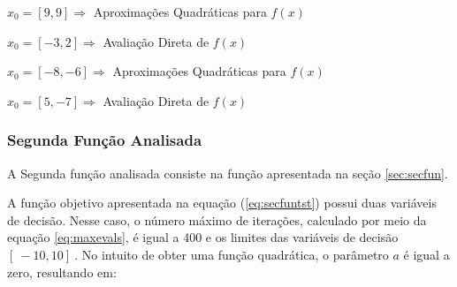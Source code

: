         \begin{minipage}{\linewidth}
            \centering
            $x_0=[9,9]\Longrightarrow$  Aproximações Quadráticas para $f(x)$
            \label{tab:tbla} 
            \writetable{\tbla}
            \bigskip
        \end{minipage}

        \begin{minipage}{\linewidth}
            \centering
            $x_0=[-3,2]\Longrightarrow$  Avaliação Direta de $f(x)$
            \label{tab:tblb} 
            \writetable{\tblb}
            \bigskip
        \end{minipage}

        \begin{minipage}{\linewidth}
            \centering
            $x_0=[-8,-6]\Longrightarrow$  Aproximações Quadráticas para $f(x)$
            \label{tab:tblc} 
            \writetable{\tblc}
            \bigskip
        \end{minipage}
        
        \begin{minipage}{\linewidth}
            \centering
            $x_0=[5,-7]\Longrightarrow$  Avaliação Direta de $f(x)$
            \label{tab:tbld} 
            \writetable{\tbld}
            \bigskip
        \end{minipage}
        
    \subsubsection{Segunda Função Analisada}

    A Segunda função analisada consiste na função apresentada na seção \ref{sec:secfun}.

    A função objetivo apresentada na equação (\ref{eq:secfuntst}) possui duas variáveis de decisão. Nesse caso, o número máximo de iterações, calculado por meio da equação \ref{eq:maxevals}, é igual a 400 e os limites das variáveis de decisão $[\ -10 , 10 ]\ $. No intuito de obter uma função quadrática, o parâmetro $a$ é igual a zero, resultando em:

